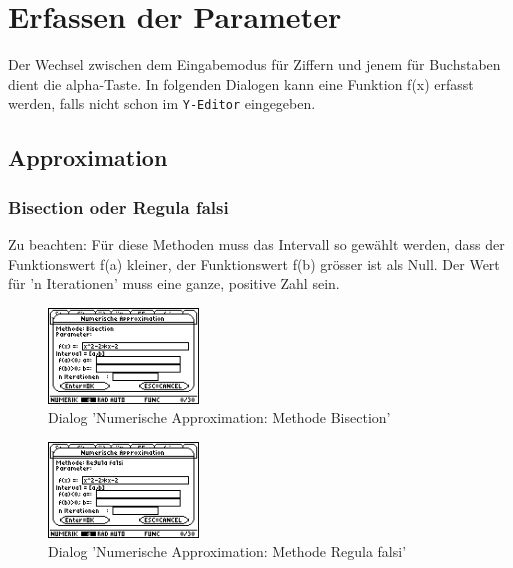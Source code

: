 \documentclass[
	a4paper							%
	,12pt							%
	,twoside						%
	,openright						%
]{scrreprt}							%
\begin{document}
\section{Erfassen der Parameter}
Der Wechsel zwischen dem Eingabemodus f\"ur Ziffern und jenem f\"ur Buchstaben dient die alpha-Taste. In folgenden Dialogen kann eine Funktion f(x) erfasst werden, falls nicht schon im \verb|Y-Editor| eingegeben.

\subsection{Approximation}
\subsubsection*{Bisection oder Regula falsi}
Zu beachten: F\"ur diese Methoden muss das Intervall so gew\"ahlt werden, dass der Funktions­wert f(a) kleiner, der Funktions­wert f(b) gr\"osser ist als Null. Der Wert f\"ur 'n Iterationen' muss eine ganze, positive Zahl sein.
\begin{figure}[h]
  \centering
  \includegraphics[width=4cm]{img/nummeth_image018.png}
  \caption{Dialog 'Numerische Approximation: Methode Bisection'}
  \label{fig:ParameterApproximationBisection}
\end{figure}
\begin{figure}[h]
  \centering
  \includegraphics[width=4cm]{img/nummeth_image020.png}
  \caption{Dialog 'Numerische Approximation: Methode Regula falsi'}
  \label{fig:ParameterApproximationRegulaFalsi}
\end{figure}

\end{document}
